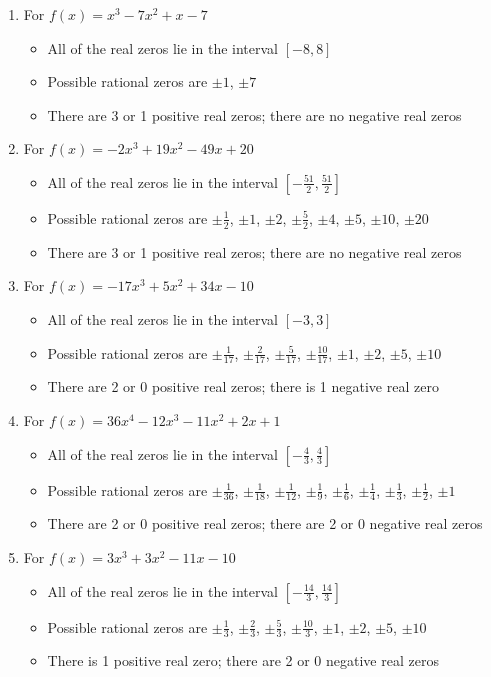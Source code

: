 \begin{enumerate}
\item For   $f(x) = x^{3} - 7x^{2} + x - 7$
\begin{itemize}
\item  All of the real zeros lie in the interval $[-8,8]$
\item  Possible rational zeros are $\pm 1$, $\pm 7$
\item  There are 3 or 1 positive real zeros;  there are no negative real zeros
\end{itemize}

\item For   $f(x) = -2x^{3} + 19x^{2} - 49x + 20$
\begin{itemize}
\item  All of the real zeros lie in the interval $\left[-\frac{51}{2},\frac{51}{2} \right]$
\item  Possible rational zeros are  $\pm \frac{1}{2}$, $\pm 1$, $\pm 2$, $\pm \frac{5}{2}$, $\pm 4$, $\pm 5$, $\pm 10$, $\pm 20$ 
\item  There are 3 or 1 positive real zeros;  there are no negative real zeros
\end{itemize}

\item For   $f(x) = -17x^{3} + 5x^{2} + 34x - 10$
\begin{itemize}
\item  All of the real zeros lie in the interval $[-3,3]$
\item  Possible rational zeros are $\pm \frac{1}{17}$, $\pm \frac{2}{17}$, $\pm \frac{5}{17}$, $\pm \frac{10}{17}$, $\pm 1$, $\pm 2$, $\pm 5$, $\pm 10$
\item  There are 2 or 0 positive real zeros;  there is 1 negative real zero
\end{itemize}

\item For   $f(x) = 36x^{4} - 12x^{3} - 11x^{2} + 2x + 1$
\begin{itemize}
\item  All of the real zeros lie in the interval $\left[-\frac{4}{3},\frac{4}{3}\right]$
\item  Possible rational zeros are $\pm \frac{1}{36}$, $\pm \frac{1}{18}$, $\pm \frac{1}{12}$, $\pm \frac{1}{9}$, $\pm \frac{1}{6}$, $\pm \frac{1}{4}$, $\pm \frac{1}{3}$, $\pm \frac{1}{2}$, $\pm 1$
\item  There are 2 or 0 positive real zeros;  there are 2 or 0 negative real zeros
\end{itemize}

\item For   $f(x) = 3x^{3} + 3x^{2} - 11x - 10$
\begin{itemize}
\item  All of the real zeros lie in the interval $\left[-\frac{14}{3},\frac{14}{3}\right]$
\item  Possible rational zeros are $\pm \frac{1}{3}$, $\pm \frac{2}{3}$, $\pm \frac{5}{3}$, $\pm \frac{10}{3}$, $\pm 1$, $\pm 2$, $\pm 5$, $\pm 10$
\item  There is 1 positive real zero;  there are 2 or 0 negative real zeros
\end{itemize}


\end{enumerate}
